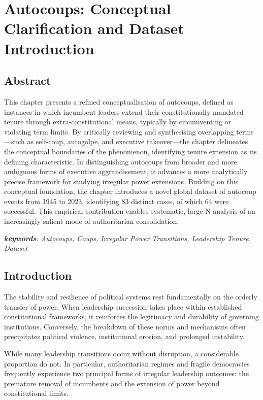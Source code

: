 \documentclass[
  12pt,
]{report}
\begin{document}
\chapter{Autocoups: Conceptual Clarification and Dataset
Introduction}\label{sec-chapter3}

\section*{Abstract}\label{abstract-1}

This chapter presents a refined conceptualisation of autocoups, defined
as instances in which incumbent leaders extend their constitutionally
mandated tenure through extra-constitutional means, typically by
circumventing or violating term limits. By critically reviewing and
synthesising overlapping terms---such as self-coup, autogolpe, and
executive takeover---the chapter delineates the conceptual boundaries of
the phenomenon, identifying tenure extension as its defining
characteristic. In distinguishing autocoups from broader and more
ambiguous forms of executive aggrandisement, it advances a more
analytically precise framework for studying irregular power extensions.
Building on this conceptual foundation, the chapter introduces a novel
global dataset of autocoup events from 1945 to 2023, identifying 83
distinct cases, of which 64 were successful. This empirical contribution
enables systematic, large-N analysis of an increasingly salient mode of
authoritarian consolidation.

\emph{\textbf{keywords}: Autocoups, Coups, Irregular Power Transitions,
Leadership Tenure, Dataset}

\section{Introduction}\label{introduction-1}

The stability and resilience of political systems rest fundamentally on
the orderly transfer of power. When leadership succession takes place
within established constitutional frameworks, it reinforces the
legitimacy and durability of governing institutions. Conversely, the
breakdown of these norms and mechanisms often precipitates political
violence, institutional erosion, and prolonged instability.

While many leadership transitions occur without disruption, a
considerable proportion do not. In particular, authoritarian regimes and
fragile democracies frequently experience two principal forms of
irregular leadership outcomes: the premature removal of incumbents and
the extension of power beyond constitutional limits.
\end{document}
